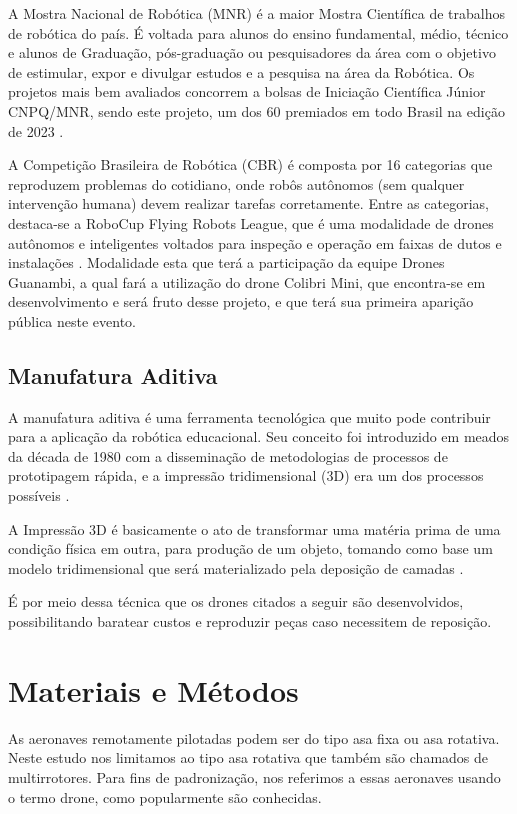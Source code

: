 \documentclass[conference]{IEEEtran}
\begin{document}
A Mostra Nacional de Robótica (MNR) é a maior Mostra Científica de trabalhos de robótica do país. É voltada para alunos do ensino fundamental, médio, técnico e alunos de Graduação, pós-graduação ou pesquisadores da área com o objetivo de estimular, expor e divulgar estudos e a pesquisa na área da Robótica. Os projetos mais bem avaliados concorrem a bolsas de Iniciação Científica Júnior CNPQ/MNR, sendo este projeto, um dos 60 premiados em todo Brasil na edição de 2023 \cite{b5}.

A Competição Brasileira de Robótica (CBR) é composta por 16 categorias que reproduzem problemas do cotidiano, onde robôs autônomos (sem qualquer intervenção humana) devem realizar tarefas corretamente. Entre as categorias, destaca-se a RoboCup Flying Robots League, que é uma modalidade de drones autônomos e inteligentes voltados para inspeção e operação em faixas de dutos e instalações \cite{b3}. Modalidade esta que terá a participação da equipe Drones Guanambi, a qual fará a utilização do drone Colibri Mini, que encontra-se em desenvolvimento e será fruto desse projeto, e que terá sua primeira aparição pública neste evento.

\subsection{Manufatura Aditiva}

A manufatura aditiva é uma ferramenta tecnológica que muito pode contribuir para a aplicação da robótica educacional. Seu conceito foi introduzido em meados da década de 1980 com a disseminação de metodologias de processos de prototipagem rápida, e a impressão tridimensional (3D) era um dos processos possíveis \cite{b10}.

A Impressão 3D é basicamente o ato de transformar uma matéria prima de uma condição física em outra, para produção de um objeto, tomando como base um modelo tridimensional que será materializado pela deposição de camadas \cite{b8}. 

É por meio dessa técnica que os drones citados a seguir são desenvolvidos, possibilitando baratear custos e reproduzir peças caso necessitem de reposição.

\section{Materiais e Métodos}

As aeronaves remotamente pilotadas podem ser do tipo asa fixa ou asa rotativa. Neste estudo nos limitamos ao tipo asa rotativa que também são chamados de multirrotores. Para fins de padronização, nos referimos a essas aeronaves usando o termo drone, como popularmente são conhecidas.
\end{document}
